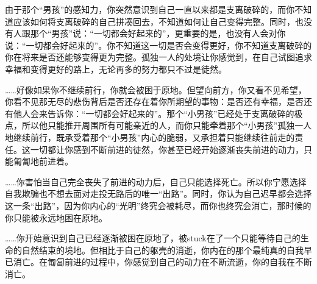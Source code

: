 由于那个“男孩”的感知力，你突然意识到自己一直以来都是支离破碎的，而你不知道应该如何将支离破碎的自己拼凑回去，不知道如何让自己变得完整。同时，也没有人跟那个“男孩”说：“一切都会好起来的”，更重要的是，也没有人会对你说：“一切都会好起来的”。你不知道这一切是否会变得更好，你不知道支离破碎的你在将来是否还能够变得更为完整。孤独一人的处境让你感觉到，在自己试图追求幸福和变得更好的路上，无论再多的努力都只不过是徒然。

……好像如果你不继续前行，你就会被困于原地。但望向前方，你又看不见希望，你看不见那无尽的悲伤背后是否还存在着你所期望的事物：是否还有幸福，是否还有他人会来告诉你：“一切都会好起来的”。那个“小男孩”已经处于支离破碎的极点，所以他只能推开周围所有可能亲近的人，而你只能牵着那个“小男孩”孤独一人地继续前行，既承受着那个“小男孩”内心的脆弱，又承担着只能继续往前走的责任。这一切都让你感到不断前进的徒然，你甚至已经开始逐渐丧失前进的动力，只能匍匐地前进着。

……你害怕当自己完全丧失了前进的动力后，自己只能选择死亡。所以你宁愿选择自我欺骗也不想去面对走投无路后的唯一“出路”。同时，你认为自己迟早都会选择这一条“出路”，因为你内心的“光明”终究会被耗尽，而你也终究会消亡，那时候的你只能被永远地困在原地。

……你开始意识到自己已经逐渐被困在原地了，被stuck在了一个只能等待自己的生命的自然结束的境地。但相比于自己的躯壳的消逝，你内在的那个最纯真的自我早已消亡。在匍匐前进的过程中，你感觉到自己的动力在不断流逝，你的自我在不断消亡。


